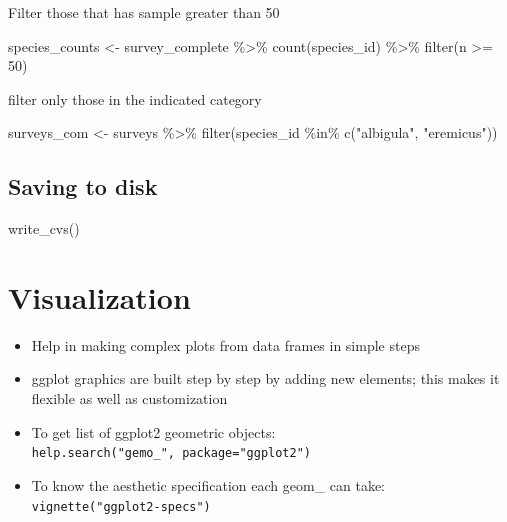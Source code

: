 \documentclass[
  letterpaper,
  DIV=11,
  numbers=noendperiod]{scrreprt}
\newenvironment{Shaded}{\begin{snugshade}}{\end{snugshade}}
\newcommand{\DecValTok}[1]{\textcolor[rgb]{0.68,0.00,0.00}{#1}}
\newcommand{\FunctionTok}[1]{\textcolor[rgb]{0.28,0.35,0.67}{#1}}
\newcommand{\NormalTok}[1]{\textcolor[rgb]{0.00,0.23,0.31}{#1}}
\newcommand{\OtherTok}[1]{\textcolor[rgb]{0.00,0.23,0.31}{#1}}
\newcommand{\SpecialCharTok}[1]{\textcolor[rgb]{0.37,0.37,0.37}{#1}}
\newcommand{\StringTok}[1]{\textcolor[rgb]{0.13,0.47,0.30}{#1}}
\providecommand{\tightlist}{%
  \setlength{\itemsep}{0pt}\setlength{\parskip}{0pt}}\usepackage{longtable,booktabs,array}
\begin{document}
Filter those that has sample greater than 50

\begin{Shaded}
\begin{Highlighting}[]
\NormalTok{species\_counts }\OtherTok{\textless{}{-}}\NormalTok{ survey\_complete }\SpecialCharTok{\%\textgreater{}\%}
  \FunctionTok{count}\NormalTok{(species\_id) }\SpecialCharTok{\%\textgreater{}\%}
  \FunctionTok{filter}\NormalTok{(n }\SpecialCharTok{\textgreater{}=} \DecValTok{50}\NormalTok{)}
\end{Highlighting}
\end{Shaded}

filter only those in the indicated category

\begin{Shaded}
\begin{Highlighting}[]
\NormalTok{surveys\_com }\OtherTok{\textless{}{-}}\NormalTok{ surveys }\SpecialCharTok{\%\textgreater{}\%}
  \FunctionTok{filter}\NormalTok{(species\_id }\SpecialCharTok{\%in\%} \FunctionTok{c}\NormalTok{(}\StringTok{"albigula"}\NormalTok{, }\StringTok{"eremicus"}\NormalTok{))}
\end{Highlighting}
\end{Shaded}

\subsection{Saving to disk}\label{saving-to-disk}

\begin{Shaded}
\begin{Highlighting}[]
\FunctionTok{write\_cvs}\NormalTok{()}
\end{Highlighting}
\end{Shaded}

\section{Visualization}\label{visualization}

\begin{itemize}
\tightlist
\item
  Help in making complex plots from data frames in simple steps
\item
  ggplot graphics are built step by step by adding new elements; this
  makes it flexible as well as customization
\item
  To get list of ggplot2 geometric objects:
  \texttt{help.search("gemo\_",\ package="ggplot2")}
\item
  To know the aesthetic specification each geom\_ can take:
  \texttt{vignette("ggplot2-specs")}
\end{itemize}
\end{document}
